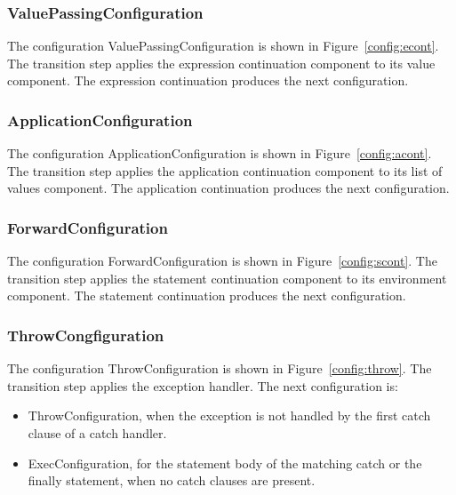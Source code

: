 \documentclass[a4paper,oneside,fleqn]{article}
\begin{document}
\subsubsection{ValuePassingConfiguration}
\label{suubsubsec:valuepassingconfig}

The configuration ValuePassingConfiguration is shown in Figure~\ref{config:econt}.
The transition step applies the expression continuation component to its value component.
The expression continuation produces the next configuration.


\subsubsection{ApplicationConfiguration}
\label{subsubsec:applicationconfig}

The configuration ApplicationConfiguration is shown in Figure~\ref{config:acont}.
The transition step applies the application continuation component to its list of values component.
The application continuation produces the next configuration.


\subsubsection{ForwardConfiguration}
\label{subsubsec:forwardconfig}

The configuration ForwardConfiguration is shown in Figure~\ref{config:scont}.
The transition step applies the statement continuation component to its environment component.
The statement continuation produces the next configuration.


\subsubsection{ThrowCongfiguration}
\label{subsubsec:throwconfig}

The configuration ThrowConfiguration is shown in Figure~\ref{config:throw}.
The transition step applies the exception handler.
The next configuration is:

\begin{itemize}
    \item ThrowConfiguration, when the exception is not handled by the first catch clause of a catch handler.
    \item ExecConfiguration, for the statement body of the matching catch or the finally statement, when no catch clauses are present.
\end{itemize}
\end{document}
